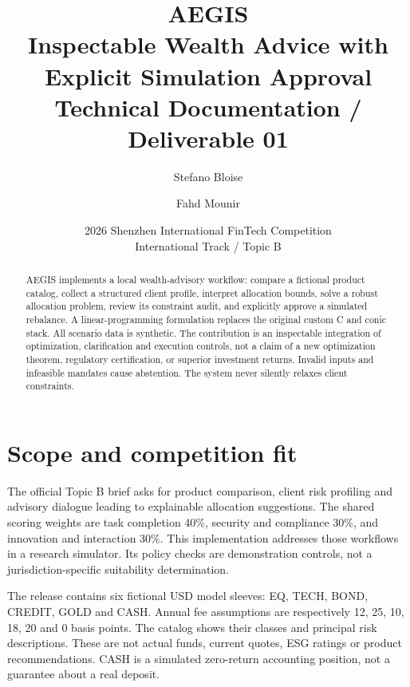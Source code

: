 \documentclass[11pt,a4paper]{article}
\title{AEGIS\\\large Inspectable Wealth Advice with Explicit Simulation Approval\\Technical Documentation / Deliverable 01}
\author{Stefano Bloise \and Fahd Mounir}
\date{2026 Shenzhen International FinTech Competition\\International Track / Topic B}
\begin{document}
\maketitle
\begin{abstract}
AEGIS implements a local wealth-advisory workflow: compare a fictional product catalog, collect a structured client profile, interpret allocation bounds, solve a robust allocation problem, review its constraint audit, and explicitly approve a simulated rebalance. A linear-programming formulation replaces the original custom C and conic stack. All scenario data is synthetic. The contribution is an inspectable integration of optimization, clarification and execution controls, not a claim of a new optimization theorem, regulatory certification, or superior investment returns. Invalid inputs and infeasible mandates cause abstention. The system never silently relaxes client constraints.
\end{abstract}
\section{Scope and competition fit}
The official Topic B brief asks for product comparison, client risk profiling and advisory dialogue leading to explainable allocation suggestions. The shared scoring weights are task completion 40\%, security and compliance 30\%, and innovation and interaction 30\%. This implementation addresses those workflows in a research simulator. Its policy checks are demonstration controls, not a jurisdiction-specific suitability determination.

The release contains six fictional USD model sleeves: EQ, TECH, BOND, CREDIT, GOLD and CASH. Annual fee assumptions are respectively 12, 25, 10, 18, 20 and 0 basis points. The catalog shows their classes and principal risk descriptions. These are not actual funds, current quotes, ESG ratings or product recommendations. CASH is a simulated zero-return accounting position, not a guarantee about a real deposit.
\end{document}
